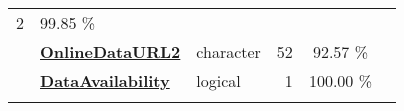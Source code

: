 \documentclass[]{article}
\begin{document}
\begin{longtable}[]{@{}lllrcl@{}}
\begin{minipage}[t]{0.10\columnwidth}
2\strut
\end{minipage} & \begin{minipage}[t]{0.10\columnwidth}\centering\strut
99.85 \%\strut
\end{minipage} & \begin{minipage}[t]{0.12\columnwidth}\raggedright\strut
\strut
\end{minipage}\tabularnewline
\begin{minipage}[t]{0.07\columnwidth}\raggedright\strut
\strut
\end{minipage} & \begin{minipage}[t]{0.35\columnwidth}\raggedright\strut
\textbf{\protect\hyperlink{onlinedataurl2}{OnlineDataURL2}}\strut
\end{minipage} & \begin{minipage}[t]{0.11\columnwidth}\raggedright\strut
character\strut
\end{minipage} & \begin{minipage}[t]{0.10\columnwidth}\raggedleft\strut
52\strut
\end{minipage} & \begin{minipage}[t]{0.10\columnwidth}\centering\strut
92.57 \%\strut
\end{minipage} & \begin{minipage}[t]{0.12\columnwidth}\raggedright\strut
\strut
\end{minipage}\tabularnewline
\begin{minipage}[t]{0.07\columnwidth}\raggedright\strut
\strut
\end{minipage} & \begin{minipage}[t]{0.35\columnwidth}\raggedright\strut
\textbf{\protect\hyperlink{dataavailability}{DataAvailability}}\strut
\end{minipage} & \begin{minipage}[t]{0.11\columnwidth}\raggedright\strut
logical\strut
\end{minipage} & \begin{minipage}[t]{0.10\columnwidth}\raggedleft\strut
1\strut
\end{minipage} & \begin{minipage}[t]{0.10\columnwidth}\centering\strut
100.00 \%\strut
\end{minipage} & \begin{minipage}[t]{0.12\columnwidth}\raggedright\strut
\strut
\end{minipage}\tabularnewline
\begin{minipage}[t]{0.07\columnwidth}\raggedright\strut
\strut

\end{minipage}
\end{longtable}
\end{document}
